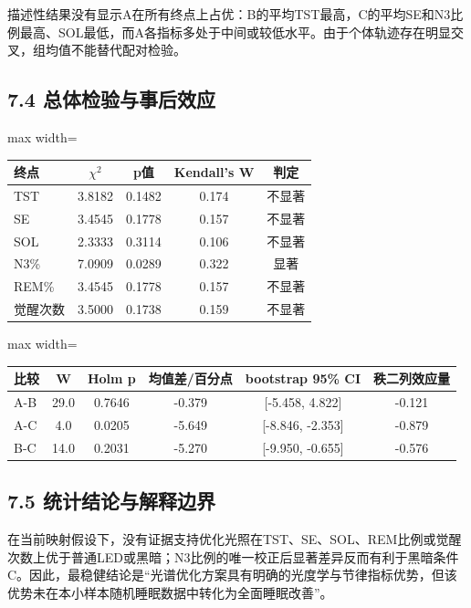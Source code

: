 \documentclass[UTF8,a4paper,12pt]{ctexart}
\begin{document}
描述性结果没有显示A在所有终点上占优：B的平均TST最高，C的平均SE和N3比例最高、SOL最低，而A各指标多处于中间或较低水平。由于个体轨迹存在明显交叉，组均值不能替代配对检验。

\subsection{7.4 总体检验与事后效应}

\begin{table}[H]
\centering
\small
\begin{adjustbox}{max width=\textwidth}
\begin{tabular}{lcccc}
\toprule
终点 & $\chi^2$ & p值 & Kendall's W & 判定 \\
\midrule
TST & 3.8182 & 0.1482 & 0.174 & 不显著 \\
SE & 3.4545 & 0.1778 & 0.157 & 不显著 \\
SOL & 2.3333 & 0.3114 & 0.106 & 不显著 \\
N3\% & 7.0909 & 0.0289 & 0.322 & 显著 \\
REM\% & 3.4545 & 0.1778 & 0.157 & 不显著 \\
觉醒次数 & 3.5000 & 0.1738 & 0.159 & 不显著 \\
\bottomrule
\end{tabular}
\end{adjustbox}
\end{table}

\begin{table}[H]
\centering
\small
\begin{adjustbox}{max width=\textwidth}
\begin{tabular}{lccccc}
\toprule
比较 & W & Holm p & 均值差/百分点 & bootstrap 95\% CI & 秩二列效应量 \\
\midrule
A-B & 29.0 & 0.7646 & -0.379 & [-5.458, 4.822] & -0.121 \\
A-C & 4.0 & 0.0205 & -5.649 & [-8.846, -2.353] & -0.879 \\
B-C & 14.0 & 0.2031 & -5.270 & [-9.950, -0.655] & -0.576 \\
\bottomrule
\end{tabular}
\end{adjustbox}
\end{table}

\subsection{7.5 统计结论与解释边界}

在当前映射假设下，没有证据支持优化光照在TST、SE、SOL、REM比例或觉醒次数上优于普通LED或黑暗；N3比例的唯一校正后显著差异反而有利于黑暗条件C。因此，最稳健结论是“光谱优化方案具有明确的光度学与节律指标优势，但该优势未在本小样本随机睡眠数据中转化为全面睡眠改善”。
\end{document}
